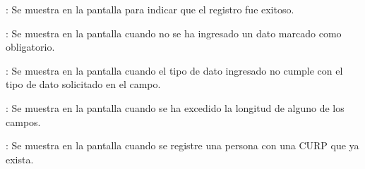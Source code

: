 \begin{Citemize}
	\item {}: Se muestra en la pantalla  para indicar que el registro fue exitoso.
	\item {}: Se muestra en la pantalla  cuando no se ha ingresado un dato marcado como obligatorio.
	\item {}: Se muestra en la pantalla  cuando el tipo de dato ingresado no cumple con el tipo de dato solicitado en el campo.
	\item {}: Se muestra en la pantalla  cuando se ha excedido la longitud de alguno de los campos.
	\item {}: Se muestra en la pantalla  cuando se registre una persona con una CURP que ya exista.
\end{Citemize}
